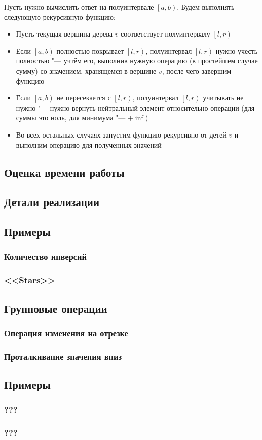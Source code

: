 \documentclass[a4paper,12pt]{article}
\begin{document}
    Пусть нужно вычислить ответ на полуинтервале
    $\left[a, b\right)$. Будем выполнять следующую
    рекурсивную функцию:
    \begin{itemize}
      \item Пусть текущая вершина дерева $v$ соответствует
        полуинтервалу $\left[l, r\right)$
      \item Если $\left[a, b\right)$ полностью покрывает
        $\left[l, r\right)$, полуинтервал
        $\left[l, r\right)$ нужно учесть полностью "---
        учтём его, выполнив нужную операцию (в простейшем
        случае сумму) со значением, хранящемся в вершине $v$,
        после чего завершим функцию
      \item Если $\left[a, b\right)$ не пересекается с
        $\left[l, r\right)$, полуинтервал
        $\left[l, r\right)$ учитывать не нужно "---
        нужно вернуть нейтральный элемент относительно
        операции (для суммы это ноль, для минимума "---
        $+\inf$)
      \item Во всех остальных случаях запустим функцию
        рекурсивно от детей $v$ и выполним операцию для
        полученных значений
    \end{itemize}

    \subsection{Оценка времени работы}

    \subsection{Детали реализации}

    \subsection{Примеры}
      \subsubsection{Количество инверсий}
      \subsubsection{<<Stars>>}

    \subsection{Групповые операции}
      \subsubsection{Операция изменения на отрезке}
      \subsubsection{Проталкивание значения вниз}

    \subsection{Примеры}
      \subsubsection{???}
      \subsubsection{???}
\end{document}
